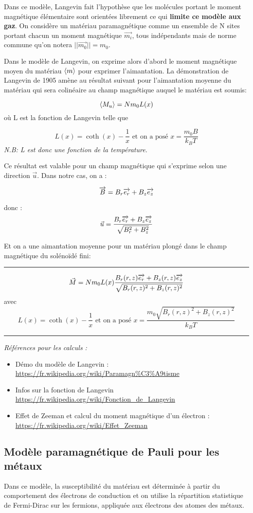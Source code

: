 Dans ce modèle, Langevin fait l'hypothèse que les molécules portant le moment magnétique élémentaire sont orientées librement ce qui \textbf{limite ce modèle aux gaz}.
On considère un matériau paramagnétique comme un ensemble de N sites portant chacun un moment magnétique $\vec{m_i}$, tous indépendants mais de norme commune qu'on notera $||\vec{m_0} || = m_0$.

Dans le modèle de Langevin, on exprime alors d'abord le moment magnétique moyen du matériau $\valmoy{m}$ pour exprimer l'aimantation. La démonstration de Langevin de 1905 amène au résultat suivant pour l'aimantation moyenne du matériau qui sera colinéaire au champ magnétique auquel le matériau est soumis:

$$\valmoy{M_u} = Nm_0L(x)$$
où L est la fonction de Langevin telle que

$$L(x) = \coth(x) - \frac{1}{x} \mbox{ et on a posé } x = \frac{m_0 B}{k_B T}$$
\emph{N.B: L est donc une fonction de la température.}

Ce résultat est valable pour un champ magnétique qui s'exprime selon une direction $\vec{u}$. Dans notre cas, on a :

$$\overrightarrow{B} = B_r \overrightarrow{e_r} + B_z \overrightarrow{e_z} $$

donc : 
$$\vec{u} = \frac{B_r \overrightarrow{e_r} + B_z \overrightarrow{e_z}}{\sqrt{B_r^2 + B_z^2}}$$

Et on a une aimantation moyenne pour un matériau plongé dans le champ magnétique du solénoïdé fini:
\rule{\textwidth}{0.4pt}
    $$\vec{M} = Nm_0L(x) \frac{B_r(r,z) \overrightarrow{e_r} + B_z(r,z) \overrightarrow{e_z}}{\sqrt{B_r(r,z)^2 + B_z(r,z)^2}} $$
avec $$L(x) = \coth(x) - \frac{1}{x} \mbox{ et on a posé } x = \frac{m_0 \sqrt{B_r(r,z)^2 + B_z(r,z)^2}}{k_B T}$$
\rule{\textwidth}{0.4pt}

\emph{Références pour les calculs : }
\begin{itemize}
    \item Démo du modèle de Langevin  : \url{https://fr.wikipedia.org/wiki/Paramagn%C3%A9tisme}
    \item Infos sur la fonction de Langevin \url{https://fr.wikipedia.org/wiki/Fonction_de_Langevin}
    \item Effet de Zeeman et calcul du moment magnétique d'un électron : \url{https://fr.wikipedia.org/wiki/Effet_Zeeman}
\end{itemize} 

\subsection{Modèle paramagnétique de Pauli pour les métaux}
Dans ce modèle, la susceptibilité du matériau est déterminée à partir du comportement des électrons de conduction et on utilise la répartition statistique de Fermi-Dirac sur les fermions, appliquée aux électrons des atomes des métaux. 

